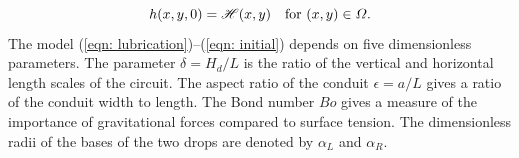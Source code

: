 \documentclass{jfm}
\begin{document}
\begin{equation}
    h(x,y,0) = \mathcal{H}(x,y) \quad \text{for $ (x,y) \in \Omega $.}  \label{eqn: initial}
\end{equation}
 The   model (\ref{eqn: lubrication})--(\ref{eqn: initial}) depends on    five  dimensionless parameters.  
 The parameter  $\delta = H_d/L$  is the ratio of the vertical and horizontal length scales of the circuit.
 The aspect ratio of the  conduit  $\epsilon = a/L $  gives a ratio of the  conduit  width to length.
The Bond number $Bo$  gives a  measure of the importance of gravitational forces compared to surface tension.
The dimensionless radii of the bases of the two drops are denoted by $\alpha_L$ and $\alpha_R$.
\end{document}
